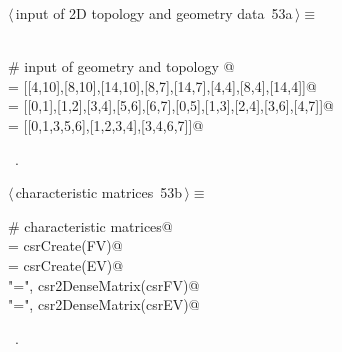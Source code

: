\documentclass[11pt,oneside]{article}	%
\begin{document}
\begin{flushleft} \small \label{scrap87}
\protect{}$\langle\,$input of 2D topology and geometry data\nobreak\ {\footnotesize 53a}$\,\rangle\equiv$
\vspace{-1ex}
\begin{list}{}{} \item
\mbox{}\verb@@\\
\mbox{}\verb@# input of geometry and topology  @\\
\mbox{} = [[4,10],[8,10],[14,10],[8,7],[14,7],[4,4],[8,4],[14,4]]@\\
\mbox{}\verb@EV = [[0,1],[1,2],[3,4],[5,6],[6,7],[0,5],[1,3],[2,4],[3,6],[4,7]]@\\
\mbox{}\verb@FV = [[0,1,3,5,6],[1,2,3,4],[3,4,6,7]]@\\
\mbox{}\verb@@{\NWsep}
\end{list}
\vspace{-1ex}
\footnotesize\addtolength{\baselineskip}{-1ex}
\begin{list}{}{\setlength{\itemsep}{-\parsep}\setlength{\itemindent}{-\leftmargin}}
\item \NWtxtMacroRefIn\ .
\end{list}
\end{flushleft}

\begin{flushleft} \small \label{scrap88}
\protect{}$\langle\,$characteristic matrices\nobreak\ {\footnotesize 53b}$\,\rangle\equiv$
\vspace{-1ex}
\begin{list}{}{} \item
\mbox{}\verb@# characteristic matrices@\\
\mbox{}\verb@csrFV = csrCreate(FV)@\\
\mbox{}\verb@csrEV = csrCreate(EV)@\\
\mbox{}\verb@print "\nFV =\n", csr2DenseMatrix(csrFV)@\\
\mbox{}\verb@print "\nEV =\n", csr2DenseMatrix(csrEV)@\\
\mbox{}\verb@@{\NWsep}
\end{list}
\vspace{-1ex}
\footnotesize\addtolength{\baselineskip}{-1ex}
\begin{list}{}{\setlength{\itemsep}{-\parsep}\setlength{\itemindent}{-\leftmargin}}
\item \NWtxtMacroRefIn\ .
\end{list}
\end{flushleft}
\end{document}
